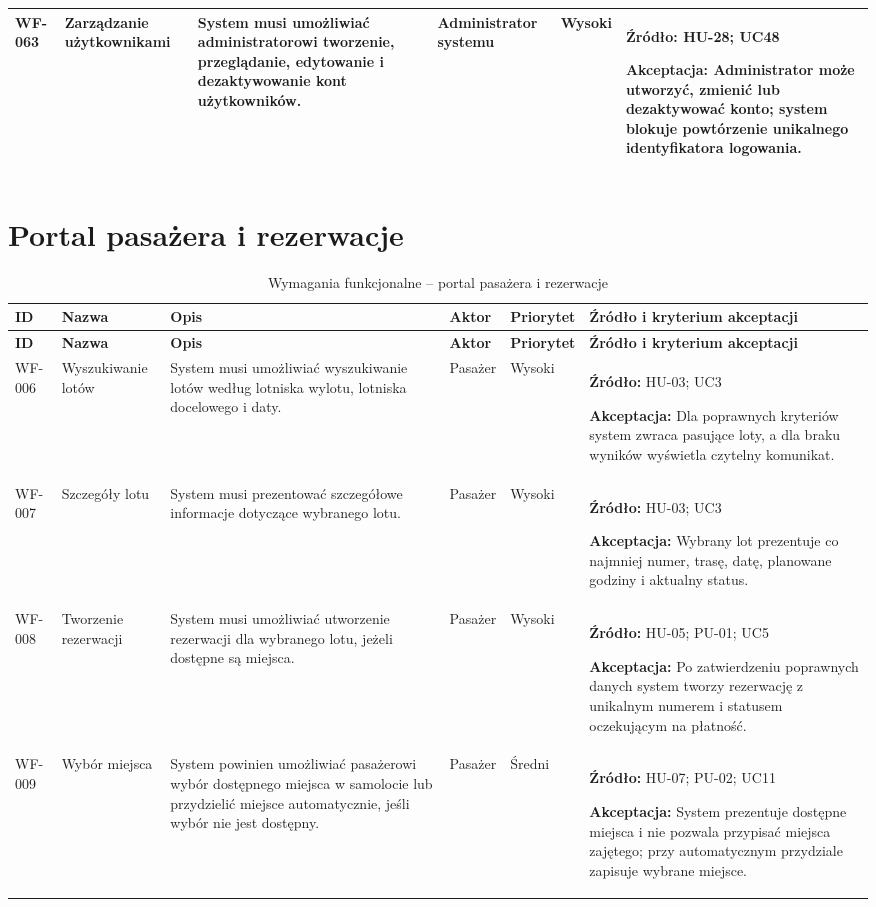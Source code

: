 \documentclass[12pt,a4paper,oneside]{report}
\begin{document}
\begin{longtable}{|p{1.05cm}|p{2.15cm}|p{3.35cm}|p{1.75cm}|p{0.95cm}|p{4.05cm}|}
WF-063 & Zarządzanie użytkownikami & System musi umożliwiać administratorowi tworzenie, przeglądanie, edytowanie i dezaktywowanie kont użytkowników. & Administrator systemu & Wysoki & \textbf{Źródło:} HU-28; UC48\par\textbf{Akceptacja:} Administrator może utworzyć, zmienić lub dezaktywować konto; system blokuje powtórzenie unikalnego identyfikatora logowania.\\\hline
\end{longtable}
\normalsize

\section{Portal pasażera i rezerwacje}
\small
\begin{longtable}{|p{1.05cm}|p{2.15cm}|p{3.35cm}|p{1.75cm}|p{0.95cm}|p{4.05cm}|}
\caption{Wymagania funkcjonalne -- portal pasażera i rezerwacje}\\\hline
\rowcolor{lightblue}\textbf{ID} & \textbf{Nazwa} & \textbf{Opis} & \textbf{Aktor} & \textbf{Priorytet} & \textbf{Źródło i kryterium akceptacji}\\\hline
\endfirsthead
\hline
\rowcolor{lightblue}\textbf{ID} & \textbf{Nazwa} & \textbf{Opis} & \textbf{Aktor} & \textbf{Priorytet} & \textbf{Źródło i kryterium akceptacji}\\\hline
\endhead
WF-006 & Wyszukiwanie lotów & System musi umożliwiać wyszukiwanie lotów według lotniska wylotu, lotniska docelowego i daty. & Pasażer & Wysoki & \textbf{Źródło:} HU-03; UC3\par\textbf{Akceptacja:} Dla poprawnych kryteriów system zwraca pasujące loty, a dla braku wyników wyświetla czytelny komunikat.\\\hline
WF-007 & Szczegóły lotu & System musi prezentować szczegółowe informacje dotyczące wybranego lotu. & Pasażer & Wysoki & \textbf{Źródło:} HU-03; UC3\par\textbf{Akceptacja:} Wybrany lot prezentuje co najmniej numer, trasę, datę, planowane godziny i aktualny status.\\\hline
WF-008 & Tworzenie rezerwacji & System musi umożliwiać utworzenie rezerwacji dla wybranego lotu, jeżeli dostępne są miejsca. & Pasażer & Wysoki & \textbf{Źródło:} HU-05; PU-01; UC5\par\textbf{Akceptacja:} Po zatwierdzeniu poprawnych danych system tworzy rezerwację z unikalnym numerem i statusem oczekującym na płatność.\\\hline
WF-009 & Wybór miejsca & System powinien umożliwiać pasażerowi wybór dostępnego miejsca w samolocie lub przydzielić miejsce automatycznie, jeśli wybór nie jest dostępny. & Pasażer & Średni & \textbf{Źródło:} HU-07; PU-02; UC11\par\textbf{Akceptacja:} System prezentuje dostępne miejsca i nie pozwala przypisać miejsca zajętego; przy automatycznym przydziale zapisuje wybrane miejsce.\\\hline

\end{longtable}
\end{document}
